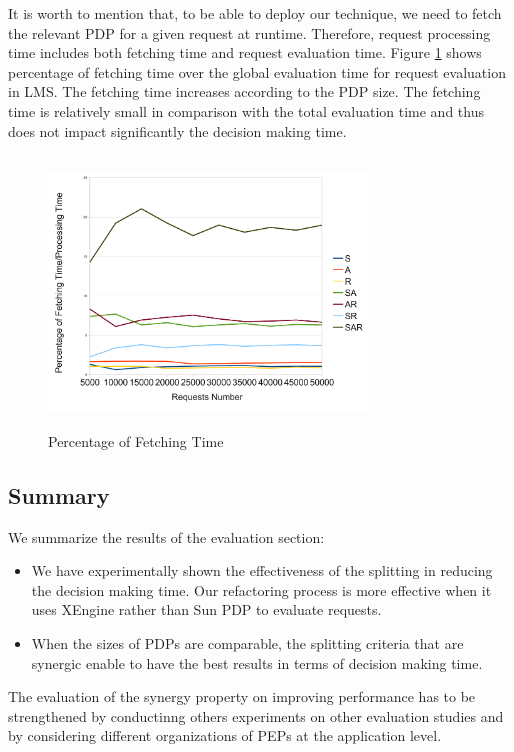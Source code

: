 It is worth to mention that, to be able to deploy our technique, we need to fetch the relevant PDP for a given request at runtime. 
Therefore, request processing time includes both fetching time and request evaluation time.
Figure \ref{Fetching Time} shows percentage of fetching time over the global evaluation time for request evaluation in LMS. 
The fetching time increases according to the PDP size. The fetching time is relatively small in comparison with the total evaluation time and thus 
does not impact significantly the decision making time.
\begin{figure}[!h]
  \centering
\includegraphics[width=8.5cm, height=7.2cm]{fetching.pdf}
\begin{center}
\caption{Percentage of Fetching Time}
\label{Fetching Time}
\end{center}
\end{figure}
\subsection{Summary}
We summarize the results of the evaluation section:
\begin{itemize}
 \item We have experimentally shown the effectiveness of the splitting in reducing the decision making time. Our refactoring process is more effective when 
it uses XEngine rather than Sun PDP to evaluate requests.
 \item When the sizes of PDPs are comparable, the splitting criteria that are synergic enable to have the best results in terms of 
decision making time.
\end{itemize}
The evaluation of the synergy property on improving performance has to be strengthened by conductinng others experiments 
on other evaluation studies and by considering different organizations of PEPs at the application level.
